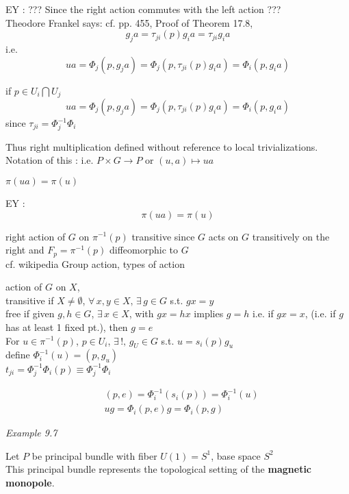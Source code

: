 \documentclass{book}
\begin{document}
EY : ??? Since the right action commutes with the left action   ??? \\
Theodore Frankel says: cf. pp. 455, Proof of Theorem 17.8, 
\[
g_ja = \tau_{ji}(p)g_i a = \tau_{ji} g_i a 
\]
i.e.
\[
ua = \Phi_j(p, g_ja) = \Phi_j(p,\tau_{ji}(p)g_ia ) = \Phi_i(p, g_ia)
\]



if $p \in U_i \bigcap U_j$
\[
ua = \Phi_j(p,g_j a) = \Phi_j(p, \tau_{ji}(p) g_i a) = \Phi_i(p,g_i a)
\]
since $\tau_{ji} = \Phi_j^{-1} \Phi_i$

Thus right multiplication defined without reference to local trivializations.  Notation of this : i.e. $P\times G \to P$ or $(u,a) \mapsto ua$




$\pi(ua) = \pi(u)$

EY : 
\[
\boxed{ \pi(ua) = \pi(u) }
\]

right action of $G$ on $\pi^{-1}(p)$ transitive since $G$ acts on $G$ transitively on the right and $F_p = \pi^{-1}(p)$ diffeomorphic to $G$ \\

cf. wikipedia Group action, types of action

action of $G$ on $X$, \\
transitive if $X \neq \emptyset $, $\forall \, x , y \in X, \, \exists \, g \in G$ s.t. $gx = y$ \\
free if given $g,h\in G$, $\exists \, x \in X$, with $gx  = hx$ implies $g=h$ i.e. if $gx = x$, (i.e. if $g$ has at least 1 fixed pt.), then $g=e$ \\

For $u \in \pi^{-1}(p)$, $p \in U_i$, $\exists \, !, \, g_U \in G$ s.t. $u = s_i(p)g_u$ \\
define $\Phi_i^{-1}(u) = (p, g_u)$   \\

$t_{ji} = \Phi_j^{-1}\Phi_i(p) \equiv \Phi_j^{-1} \Phi_i$

\[
\begin{aligned}
  & (p,e) = \Phi_i^{-1}(s_i(p)) = \Phi_i^{-1}(u) \\ 
  &  ug = \Phi_i(p,e)g = \Phi_i(p,g)
\end{aligned}
\]



\emph{Example 9.7}

Let $P$ be principal bundle with fiber $U(1) = S^1$, base space $S^2$ \\
This principal bundle represents the topological setting of the \textbf{magnetic monopole}.   \\
\end{document}

